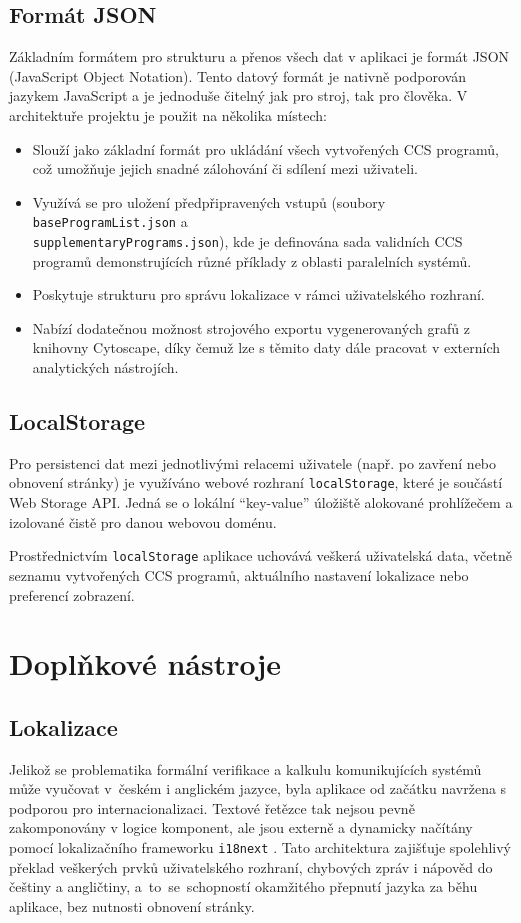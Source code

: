 \subsection{Formát JSON}
Základním formátem pro strukturu a přenos všech dat v aplikaci je formát JSON (JavaScript Object Notation). 
Tento datový formát je nativně podporován jazykem JavaScript a je jednoduše čitelný jak pro stroj, tak pro člověka. 
V architektuře projektu je použit na několika místech:
\begin{itemize}
    \item Slouží jako základní formát pro ukládání všech vytvořených CCS programů, což umožňuje jejich snadné zálohování či sdílení mezi uživateli.
    \item Využívá se pro uložení předpřipravených vstupů (soubory \texttt{baseProgramList.json} a \\ \texttt{supplementaryPrograms.json}), kde je definována sada validních CCS programů demonstrujících různé příklady z oblasti paralelních systémů.
    \item Poskytuje strukturu pro správu lokalizace v rámci uživatelského rozhraní.
    \item Nabízí dodatečnou možnost strojového exportu vygenerovaných grafů z knihovny Cytoscape, díky čemuž lze s těmito daty dále pracovat v externích analytických nástrojích.
\end{itemize}

\subsection{LocalStorage}
Pro persistenci dat mezi jednotlivými relacemi uživatele (např. po zavření nebo obnovení stránky) je využíváno webové rozhraní \texttt{localStorage}, které je součástí Web Storage API. 
Jedná se o lokální \enquote{key-value} úložiště alokované prohlížečem a izolované čistě pro danou webovou doménu.

Prostřednictvím \texttt{localStorage} aplikace uchovává veškerá uživatelská data, včetně seznamu vytvořených CCS programů, aktuálního nastavení lokalizace nebo preferencí zobrazení. 

\section{Doplňkové nástroje}

\subsection{Lokalizace}
Jelikož se problematika formální verifikace a kalkulu komunikujících systémů může vyučovat v~českém i anglickém jazyce, byla aplikace od začátku navržena s podporou pro internacionalizaci. 
Textové řetězce tak nejsou pevně zakomponovány v logice komponent, ale jsou externě a dynamicky načítány pomocí lokalizačního frameworku \texttt{i18next} \cite{i18nextcom_2026_introduction}. 
Tato architektura zajišťuje spolehlivý překlad veškerých prvků uživatelského rozhraní, chybových zpráv i nápověd do češtiny a angličtiny, a~to~se~schopností okamžitého přepnutí jazyka za běhu aplikace, bez nutnosti obnovení stránky.

